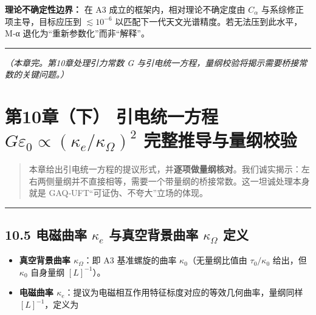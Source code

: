 \textbf{理论不确定性边界：} 在 A3 成立的框架内，相对理论不确定度由
\(C_\alpha\) 与系综修正项主导，目标应压到 \(\lesssim10^{-6}\)
以匹配下一代天文光谱精度。若无法压到此水平，M‑α
退化为``重新参数化''而非``解释''。

\begin{center}\rule{0.5\linewidth}{0.5pt}\end{center}

\emph{（本章完。第10章处理引力常数 G
与引电统一方程，量纲校验将揭示需要桥接常数的关键问题。）}

\section{\texorpdfstring{第10章（下） 引电统一方程
\(G\varepsilon_0 \propto (\kappa_e/\kappa_\Omega)^2\)
完整推导与量纲校验}{第10章（下） 引电统一方程 G\textbackslash varepsilon\_0 \textbackslash propto (\textbackslash kappa\_e/\textbackslash kappa\_\textbackslash Omega)\^{}2 完整推导与量纲校验}}\label{ux7b2c10ux7ae0ux4e0b-ux5f15ux7535ux7edfux4e00ux65b9ux7a0b-gvarepsilon_0-propto-kappa_ekappa_omega2-ux5b8cux6574ux63a8ux5bfcux4e0eux91cfux7eb2ux6821ux9a8c}

\begin{quote}
本章给出引电统一方程的提议形式，并\textbf{逐项做量纲核对}。我们诚实揭示：左右两侧量纲并不直接相等，需要一个带量纲的桥接常数。这一坦诚处理本身就是
GAQ‑UFT``可证伪、不夸大''立场的体现。
\end{quote}

\begin{center}\rule{0.5\linewidth}{0.5pt}\end{center}

\subsection{\texorpdfstring{10.5 电磁曲率 \(\kappa_e\) 与真空背景曲率
\(\kappa_\Omega\)
定义}{10.5 电磁曲率 \textbackslash kappa\_e 与真空背景曲率 \textbackslash kappa\_\textbackslash Omega 定义}}\label{ux7535ux78c1ux66f2ux7387-kappa_e-ux4e0eux771fux7a7aux80ccux666fux66f2ux7387-kappa_omega-ux5b9aux4e49}

\begin{itemize}
\tightlist
\item
  \textbf{真空背景曲率 \(\kappa_\Omega\)}：即 A3 基准螺旋的曲率
  \(\kappa_0\)（无量纲比值由 \(\tau_0/\kappa_0\) 给出，但 \(\kappa_0\)
  自身量纲 \([L]^{-1}\)）。
\item
  \textbf{电磁曲率
  \(\kappa_e\)}：提议为电磁相互作用特征标度对应的等效几何曲率，量纲同样
  \([L]^{-1}\)，定义为
\end{itemize}

